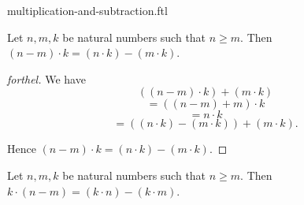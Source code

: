 \documentclass{naproche-library}
\begin{document}
\begin{smodule}[title=Multiplication and Subtraction]{multiplication-and-subtraction.ftl}

\begin{proposition}[forthel,id=ARITHMETIC_06_5458841930039296]
  Let $n, m, k$ be natural numbers such that $n \geq m$.
  Then $(n - m) \cdot k = (n \cdot k) - (m \cdot k)$.
\end{proposition}
\begin{proof}[forthel]
  We have
  \[  ((n - m) \cdot k) + (m \cdot k)                 \]
  \[    = ((n - m) + m) \cdot k                       \]
  \[    = n \cdot k                                   \]
  \[    = ((n \cdot k) - (m \cdot k)) + (m \cdot k).  \]

  Hence $(n - m) \cdot k = (n \cdot k) - (m \cdot k)$.
\end{proof}

\begin{corollary}[forthel,id=ARITHMETIC_06_8461123277815808]
  Let $n, m, k$ be natural numbers such that $n \geq m$.
  Then $k \cdot (n - m) = (k \cdot n) - (k \cdot m)$.
\end{corollary}
\end{smodule}
\end{document}
